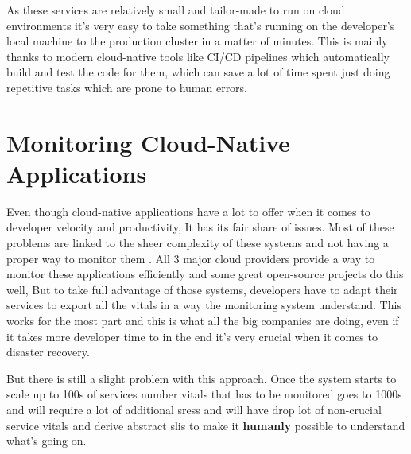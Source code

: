 As these services are relatively small and tailor-made to run on cloud environments it's very easy to take something that's running on the developer's local machine to the production cluster in a matter of minutes. This is mainly thanks to modern cloud-native tools like CI/CD pipelines which automatically build and test the code for them, which can save a lot of time spent just doing repetitive tasks which are prone to human errors. \citep{Whataret68:online}

\section{Monitoring Cloud-Native Applications} \label{monitoring-bg}
Even though cloud-native applications have a lot to offer when it comes to developer velocity and productivity, It has its fair share of issues. Most of these problems are linked to the sheer complexity of these systems and not having a proper way to monitor them \citep{5WaysYou35:online}. All 3 major cloud providers provide a way to monitor these applications efficiently and some great open-source projects do this well, But to take full advantage of those systems, developers have to adapt their services to export all the vitals in a way the monitoring system understand. This works for the most part and this is what all the big companies are doing, even if it takes more developer time to in the end it's very crucial when it comes to disaster recovery.

But there is still a slight problem with this approach. Once the system starts to scale up to 100s of services number vitals that has to be monitored goes to 1000s and will require a lot of additional \acp{sres} and will have drop lot of non-crucial service vitals and derive abstract \acp{sli} to make it \textbf{humanly} possible to understand what's going on.
